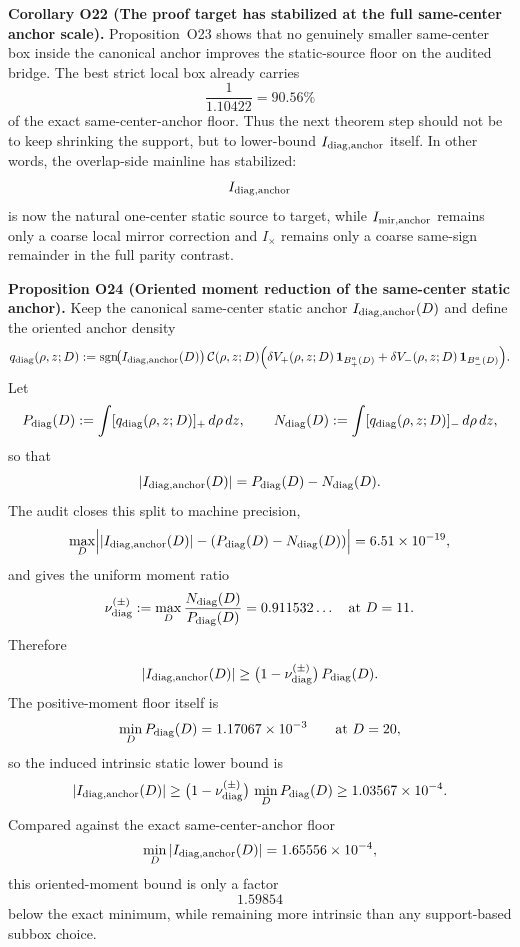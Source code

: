 \documentclass[aps,prd,onecolumn,notitlepage,nofootinbib,superscriptaddress,11pt,floatfix]{revtex4-2}
\begin{document}
\medskip\noindent\textbf{Corollary O22 (The proof target has stabilized at the full same-center anchor scale).}
Proposition~O23 shows that no genuinely smaller same-center box inside the canonical anchor improves the static-source floor on the audited bridge. The best strict local box already carries
\[
\frac{1}{1.10422}=90.56\%
\]
of the exact same-center-anchor floor. Thus the next theorem step should not be to keep shrinking the support, but to lower-bound \(I_{\rm diag,anchor}\) itself. In other words, the overlap-side mainline has stabilized:
\[
I_{\rm diag,anchor}
\]
is now the natural one-center static source to target, while \(I_{\rm mir,anchor}\) remains only a coarse local mirror correction and \(I_\times\) remains only a coarse same-sign remainder in the full parity contrast.

\medskip\noindent\textbf{Proposition O24 (Oriented moment reduction of the same-center static anchor).}
Keep the canonical same-center static anchor \(I_{\rm diag,anchor}(D)\) and define the oriented anchor density
\[
q_{\rm diag}(\rho,z;D)
:=
\operatorname{sgn}\!\bigl(I_{\rm diag,anchor}(D)\bigr)\,
\mathcal C(\rho,z;D)\Bigl(
\delta V_+(\rho,z;D)\,\mathbf 1_{B_+^a(D)}
+
\delta V_-(\rho,z;D)\,\mathbf 1_{B_-^a(D)}
\Bigr).
\]
Let
\[
P_{\rm diag}(D):=\int [q_{\rm diag}(\rho,z;D)]_+\,d\rho\,dz,
\qquad
N_{\rm diag}(D):=\int [q_{\rm diag}(\rho,z;D)]_-\,d\rho\,dz,
\]
so that
\[
|I_{\rm diag,anchor}(D)|=P_{\rm diag}(D)-N_{\rm diag}(D).
\]
The audit  closes this split to machine precision,
\[
\max_D \Bigl||I_{\rm diag,anchor}(D)|-(P_{\rm diag}(D)-N_{\rm diag}(D))\Bigr|
=
6.51\times10^{-19},
\]
and gives the uniform moment ratio
\[
\nu_{\rm diag}^{(\pm)}
:=
\max_D \frac{N_{\rm diag}(D)}{P_{\rm diag}(D)}
=
0.911532\ldots
\quad\text{at }D=11.
\]
Therefore
\[
|I_{\rm diag,anchor}(D)|
\ge
\bigl(1-\nu_{\rm diag}^{(\pm)}\bigr)\,P_{\rm diag}(D).
\]
The positive-moment floor itself is
\[
\min_D P_{\rm diag}(D)=1.17067\times10^{-3}
\qquad\text{at }D=20,
\]
so the induced intrinsic static lower bound is
\[
|I_{\rm diag,anchor}(D)|
\ge
\bigl(1-\nu_{\rm diag}^{(\pm)}\bigr)\,\min_D P_{\rm diag}(D)
\ge
1.03567\times10^{-4}.
\]
Compared against the exact same-center-anchor floor
\[
\min_D |I_{\rm diag,anchor}(D)|=1.65556\times10^{-4},
\]
this oriented-moment bound is only a factor
\[
1.59854
\]
below the exact minimum, while remaining more intrinsic than any support-based subbox choice.
\end{document}
